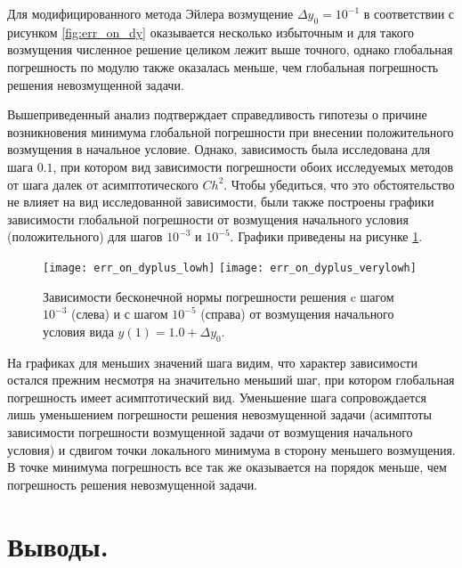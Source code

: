 \documentclass[a4paper, 12pt]{article}
\theoremstyle{mythm}
\begin{document}
	Для модифицированного метода Эйлера возмущение $\Delta y_0 = 10^{-1}$ в соответствии с рисунком \ref{fig:err_on_dy} оказывается несколько избыточным и для такого возмущения численное решение целиком лежит выше точного, однако глобальная погрешность по модулю также оказалась меньше, чем глобальная погрешность решения невозмущенной задачи.
	
	Вышеприведенный анализ подтверждает справедливость гипотезы о причине возникновения минимума глобальной погрешности при внесении положительного возмущения в начальное условие. Однако, зависимость была исследована для шага $0.1$, при котором вид зависимости погрешности обоих исследуемых методов от шага далек от асимптотического $Ch^2$. Чтобы убедиться, что это обстоятельство не влияет на вид исследованной зависимости, были также построены графики зависимости глобальной погрешности от возмущения начального условия (положительного) для шагов $10^{-3}$ и $10^{-5}$. Графики приведены на рисунке \ref{fig:disturbed_lowh}.
	
	\begin{figure}[H]
		\texttt{[image: err\_on\_dyplus\_lowh]}
		\texttt{[image: err\_on\_dyplus\_verylowh]}
		\caption{Зависимости бесконечной нормы погрешности решения c шагом $10^{-3}$ (слева) и с шагом $10^{-5}$ (справа) от возмущения начального условия вида $y(1) = 1.0+\Delta y_0$.}\label{fig:disturbed_lowh}
	\end{figure}
	
	На графиках для меньших значений шага видим, что характер зависимости остался прежним несмотря на значительно меньший шаг, при котором глобальная погрешность имеет асимптотический вид. Уменьшение шага сопровождается лишь уменьшением погрешности решения невозмущенной задачи (асимптоты зависимости погрешности возмущенной задачи от возмущения начального условия) и сдвигом точки локального минимума в сторону меньшего возмущения. В точке минимума погрешность все так же оказывается на порядок меньше, чем погрешность решения невозмущенной задачи.
	
	\section{Выводы.}
	
\end{document}
